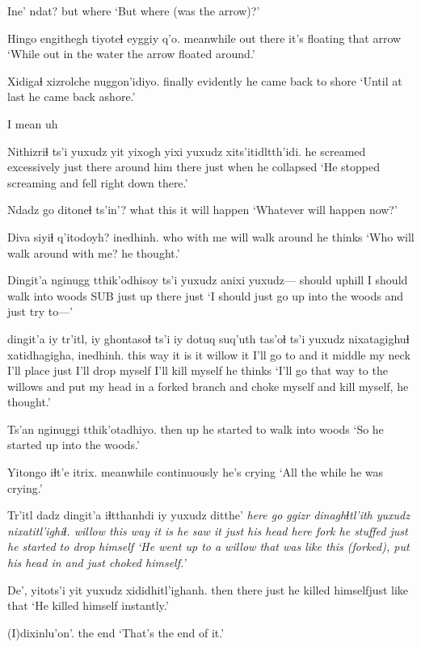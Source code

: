 \documentclass[12pt]{article}
\begin{document}
\gll Ine' ndat? 
but where
\glt   `But where (was the arrow)?'
\glend

\gll Hingo engithegh tiyoteɬ eyggiy q'o. 
meanwhile {out there} {it's floating} that arrow
\glt `While out in the water the arrow floated around.' 
\glend

\gll Xidigaɬ xizrolche nuggon'idiyo. 
finally evidently {he came back to shore}
\glt `Until at last he came back ashore.' 
\glend

I mean uh

\gll Nithizriɬ ts'i yuxudz yit yixogh yixi yuxudz xits'itidltth'idi. 
{he screamed excessively} {} just there {around him} there just {when he collapsed}
\glt `He stopped screaming and fell right down there.' 
\glend

\gll Ndadz go ditoneɬ ts'in'? 
what this {it will happen} {}
\glt `Whatever will happen now?'
\glend

\gll Diva siyiɬ q'itodoyh? inedhinh. 
who {with me} {will walk around} {he thinks}
\glt `Who will walk around with me? he thought.'
\glend

\gll Dingit'a nginugg tthik'odhisoy ts'i yuxudz anixi yuxudz---
should {uphill} {I should walk into woods} SUB just {up there} just
\glt `I should just go up into the woods and just try to---'
\glend

 dingit'a iy tr'itl, iy ghontasoɬ ts'i iy dotuq suq'uth tas'oɬ ts'i yuxudz nixatagighuɬ xatidhagigha, inedhinh.
{this way} {it is} it willow it {I'll go to} and it middle {my neck} {I'll place} {} just {I'll drop myself} {I'll kill myself} {he thinks}
\glt `I'll go that way to the willows and put my head in a forked branch and choke myself and kill myself, he thought.'
\glend

\gll Ts'an nginuggi tthik'otadhiyo.
then up {he started to walk into woods}
\glt `So he started up into the woods.' 
\glend

\gll Yitongo iɬt'e itrix.
meanwhile continuously {he's crying}
\glt `All the while he was crying.' 
\glend

\gll Tr'itl dadz dingit'a iɬtthanhdi iy yuxudz ditthe' \em{here} go ggizr dinaghɬtl'ith yuxudz nixatitl'ighiɬ. 
willow {this way} {it is} {he saw} it just {his head} {} here fork {he stuffed} just {he started to drop himself}
\glt `He went up to a willow that was like this (forked), put his head in and just choked himself.' 
\glend

\gll De', yitots'i yit yuxudz xididhitl'ighanh. 
then there just {he killed himself}{just like that} 
\glt `He killed himself instantly.' 
\glend

\gll (I)dixinlu'on'.
{{the end}}
\glt `That's the end of it.' 
\glend
\end{document}
